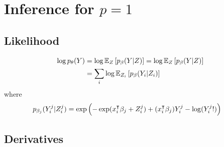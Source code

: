 \section{Inference for $p = 1$}  \label{sec:inferenceP1}

\subsection{Likelihood}
\begin{align*}
 \log p_\theta(Y) 
 & = \log\mathbb E_Z \left[ p_\beta(Y|Z) \right]
 = \log \mathbb E_Z \left[ p_{\beta}(Y|Z)\right] \\
 & = \sum_i \log \mathbb E_{Z_i} \left[ p_{\beta}(Y_i|Z_i) \right]
\end{align*}
where 
\begin{align*}
 p_{\beta_j}(Y_i^j|Z_i^j) 
 & = \exp\left(-\exp(x_i^\intercal \beta_j + Z_i^j) + (x_i^\intercal \beta_j) Y_i^j - \log(Y_i^j !)
 \right) 
\end{align*}

\subsection{Derivatives}

